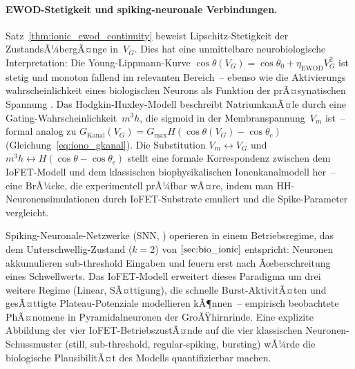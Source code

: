 ﻿\documentclass[12pt, a4paper, openany]{report}
\begin{document}
\paragraph{EWOD-Stetigkeit und spiking-neuronale Verbindungen.}
Satz~\ref{thm:ionic_ewod_continuity} beweist Lipschitz-Stetigkeit der
ZustandsÃ¼bergÃ¤nge in~$V_G$.  Dies hat eine unmittelbare neurobiologische
Interpretation: Die Young-Lippmann-Kurve
$\cos\theta(V_G) = \cos\theta_0 + \eta_{\text{EWOD}} V_G^2$ ist stetig
und monoton fallend im relevanten Bereich~-- ebenso wie die Aktivierungs\-
wahrscheinlichkeit eines biologischen Neurons als Funktion der prÃ¤synatischen
Spannung \cite{hodgkin52}.  Das Hodgkin-Huxley-Modell \cite{hodgkin52}
beschreibt NatriumkanÃ¤le durch eine Gating-Wahrscheinlichkeit~$m^3 h$, die
sigmoid in der Membranspannung~$V_m$ ist~-- formal analog zu
$G_{\text{Kanal}}(V_G) = G_{\max} H(\cos\theta(V_G) - \cos\theta_c)$
(Gleichung~\ref{eq:iono_gkanal}).  Die Substitution $V_m \leftrightarrow V_G$
und $m^3 h \leftrightarrow H(\cos\theta - \cos\theta_c)$ stellt eine
formale Korrespondenz zwischen dem IoFET-Modell und dem klassischen
biophysikalischen Ionenkanal\-modell her~-- eine BrÃ¼cke, die experimentell
prÃ¼fbar wÃ¤re, indem man HH-Neuronensimulationen durch IoFET-Substrate
emuliert und die Spike-Parameter vergleicht.

Spiking-Neuronale-Netzwerke (SNN, \cite{maass97}) operieren in einem
Betriebsregime, das dem Unterschwellig-Zustand ($k=2$) von
$\cref{sec:bio_ionic}$ entspricht: Neuronen akkumulieren sub-threshold
Eingaben und feuern erst nach Ãœberschreitung eines Schwellwerts.  Das
IoFET-Modell erweitert dieses Paradigma um drei weitere Regime (Linear,
SÃ¤ttigung), die schnelle Burst-AktivitÃ¤ten und gesÃ¤ttigte Plateau-Potenziale
modellieren kÃ¶nnen~-- empirisch beobachtete PhÃ¤nomene in Pyramidalneuronen
der GroÃŸhirnrinde.  Eine explizite Abbildung der vier IoFET-BetriebszustÃ¤nde
auf die vier klassischen Neuronen-Schussmuster (still, sub-threshold,
regular-spiking, bursting) wÃ¼rde die biologische PlausibilitÃ¤t des Modells
quantifizierbar machen.
\end{document}
